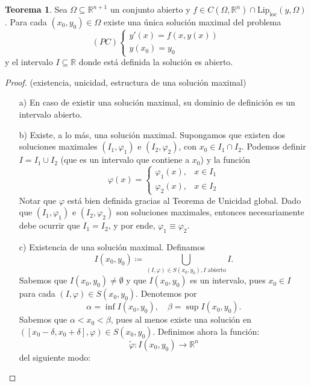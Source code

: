 \documentclass[11pt]{article}
\theoremstyle{definition} %
\newtheorem{theorem}{Teorema}[section]
\begin{document}
\begin{theorem}
  Sea $\Omega \subseteq \mathbb{R}^{n+1}$ un conjunto abierto y $f \in C(\Omega, \mathbb{R}^n) \cap \text{Lip}_{\text{loc}}(y, \Omega)$. Para cada $(x_0, y_0) \in \Omega$ existe una única solución maximal del problema
  \[ (PC) \begin{cases} y'(x) = f(x, y(x)) \\ y(x_0) = y_0 \end{cases} \]
  y el intervalo $I \subseteq \mathbb{R}$ donde está definida la solución es abierto.
\end{theorem}

\begin{proof} (existencia, unicidad, estructura de una solución maximal)
  \begin{enumerate}
      \item[a)] En caso de existir una solución maximal, su dominio de definición es un intervalo abierto.

      \item[b)] Existe, a lo más, una solución maximal. Supongamos que existen dos soluciones maximales $(I_1, \varphi_1)$ e $(I_2, \varphi_2)$, con $x_0 \in I_1 \cap I_2$. Podemos definir $I = I_1 \cup I_2$ (que es un intervalo que contiene a $x_0$) y la función
      \[ \varphi(x) = \begin{cases} \varphi_1(x), & x \in I_1 \\ \varphi_2(x), & x \in I_2 \end{cases} \]
      Notar que $\varphi$ está bien definida gracias al Teorema de Unicidad global. Dado que $(I_1, \varphi_1)$ e $(I_2, \varphi_2)$ son soluciones maximales, entonces necesariamente debe ocurrir que $I_1 = I_2$, y por ende, $\varphi_1 \equiv \varphi_2$.

      \item[c)] Existencia de una solución maximal. Definamos
      \[ I(x_0, y_0) \coloneqq \bigcup_{(I, \varphi) \in S(x_0, y_0), I \text{ abierto}} I. \]
      Sabemos que $I(x_0, y_0) \neq \emptyset$ y que $I(x_0, y_0)$ es un intervalo, pues $x_0 \in I$ para cada $(I, \varphi) \in S(x_0, y_0)$. Denotemos por
      \[ \alpha = \inf I(x_0, y_0), \quad \beta = \sup I(x_0, y_0). \]
      Sabemos que $\alpha < x_0 < \beta$, pues al menos existe una solución en $([x_0 - \delta, x_0 + \delta], \varphi) \in S(x_0, y_0)$. Definimos ahora la función:
      \[ \tilde{\varphi} : I(x_0, y_0) \rightarrow \mathbb{R}^n \]
      del siguiente modo:
    

\end{enumerate}
\end{proof}
\end{document}
